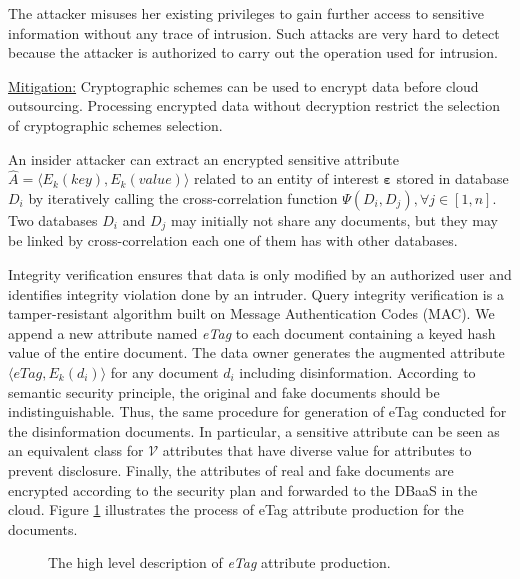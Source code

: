 \smallskip

 The attacker misuses her existing privileges to gain further access to sensitive information without any trace of intrusion. Such attacks are very hard to detect because the attacker is authorized to carry out the operation used for intrusion. 

\underline{Mitigation:} Cryptographic schemes can be used to encrypt data before cloud outsourcing. Processing encrypted data without decryption restrict the selection of cryptographic schemes selection.

An insider attacker can extract an encrypted sensitive attribute $\hat{A}=\langle E_k(key), E_k(value) \rangle$ related to an entity of interest $\bm{\varepsilon}$ stored in database $D_i$ by iteratively calling the cross-correlation function $\Psi (D_i, D_j), \forall j \in [1, n]$. Two databases $D_i$ and $D_j$ may initially not share any documents, but they may be linked by cross-correlation each one of them has with other databases.

 Integrity verification ensures that data is only modified by an authorized user and identifies integrity violation done by an intruder. Query integrity verification is a tamper-resistant algorithm built on Message Authentication Codes (MAC). We append a new attribute named \emph{eTag} to each document containing a keyed hash value of the entire document. The data owner generates the augmented attribute $\langle eTag, E_k(d_i)\rangle$ for any document $d_i$ including disinformation. 
According to semantic security principle, the original and fake documents should be indistinguishable. Thus, the same procedure for generation of eTag conducted for the disinformation documents. In particular, a sensitive attribute can be seen as an equivalent class for $\mathcal{V}$ attributes that have diverse value for attributes to prevent disclosure. Finally, the attributes of real and fake documents are encrypted according to the security plan and forwarded to the DBaaS in the cloud. Figure \ref{fig:eTagAttribute} illustrates the process of eTag attribute production for the documents.

\begin{figure}[H]
\centering
\resizebox{0.8\textwidth}{!}{}
\caption{The high level description of \textit{eTag} attribute production.}
\label{fig:eTagAttribute}
\end{figure}


